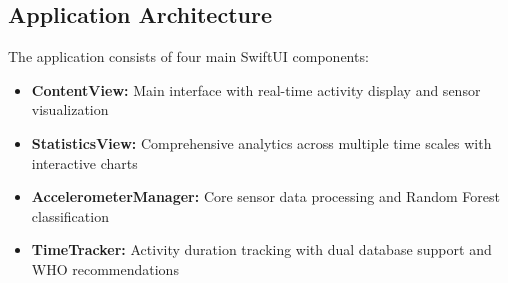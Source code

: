 \documentclass[11pt,a4paper]{article}
\begin{document}
\subsection{Application Architecture}

The application consists of four main SwiftUI components:

\begin{itemize}
    \item \textbf{ContentView:} Main interface with real-time activity display and sensor visualization
    \item \textbf{StatisticsView:} Comprehensive analytics across multiple time scales with interactive charts
    \item \textbf{AccelerometerManager:} Core sensor data processing and Random Forest classification
    \item \textbf{TimeTracker:} Activity duration tracking with dual database support and WHO recommendations
\end{itemize}
\end{document}
